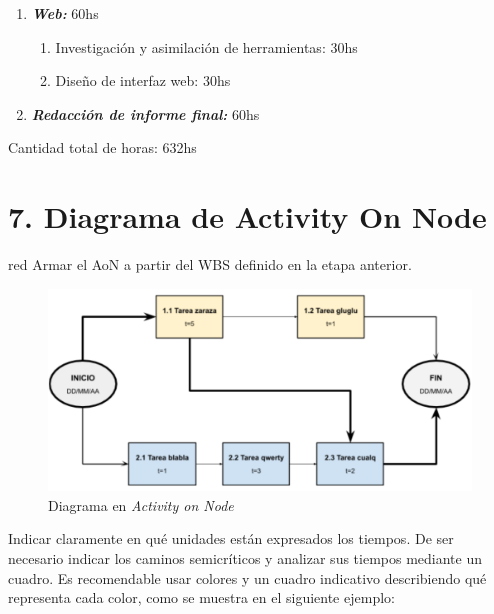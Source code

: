 \documentclass[11pt]{charter}
\begin{document}
\begin{enumerate}
	 \item \textbf{\textit{Web:}} 60hs
	 \begin{enumerate}
	 	\item Investigación y asimilación de herramientas: 30hs
	 	\item Diseño de interfaz web: 30hs
	 \end{enumerate}
	 
	 \item \textbf{\textit{Redacción de informe final:}} 60hs
\end{enumerate}

Cantidad total de horas: 632hs

\clearpage

\section{7. Diagrama de Activity On Node}
\label{sec:AoN}

\begin{consigna}{red}
Armar el AoN a partir del WBS definido en la etapa anterior. 



\end{consigna}

\begin{figure}[htpb]
\centering 
\includegraphics[width=.8\textwidth]{./Figuras/AoN.png}
\caption{Diagrama en \textit{Activity on Node}}
\label{fig:AoN}
\end{figure}

Indicar claramente en qué unidades están expresados los tiempos.
De ser necesario indicar los caminos semicríticos y analizar sus tiempos mediante un cuadro.
Es recomendable usar colores y un cuadro indicativo describiendo qué representa cada color, como se muestra en el siguiente ejemplo:
\end{document}
